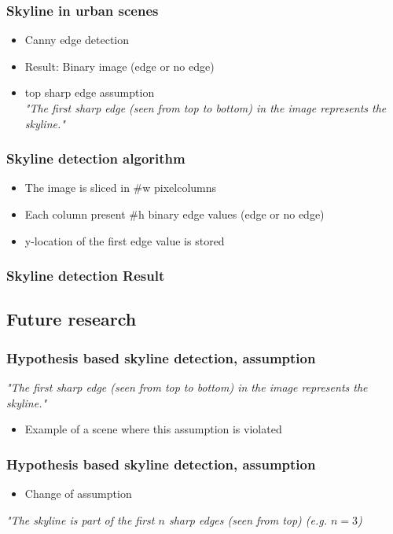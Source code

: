 \documentclass{beamer}
\begin{document}
\frame
{
	\frametitle{Skyline in urban scenes}%
	\begin{itemize}
		\item  <+-| alert@+> Canny edge detection 
		\item  <+-| alert@+> Result: Binary image (edge or no edge)
		\item  <+-| alert@+> top sharp edge assumption\\
		\emph{"The first sharp edge (seen from top to bottom) in the image represents the skyline."}
	\end{itemize}
}


\frame
{
	\frametitle{Skyline detection algorithm}%
	\begin{itemize}
		\item  <+-| alert@+> The image is sliced in \#w pixelcolumns
		\item  <+-| alert@+> Each column present \#h binary edge values (edge or no edge)
		\item  <+-| alert@+> y-location of the first edge value is stored 
	\end{itemize}
}



\frame
{
	\frametitle{Skyline detection Result}%
}

\subsection{Future research}
\frame
{
	\frametitle{Hypothesis based skyline detection, assumption}
	\emph{"The first sharp edge (seen from top to bottom) in the image represents the skyline."}
	\begin{itemize}
	\item  <+-| alert@+> Example of a scene where this assumption is violated
	\end{itemize}
}

\frame
{
	\frametitle{Hypothesis based skyline detection, assumption}
	\begin{itemize}
	\item  <+-| alert@+> Change of assumption
	\end{itemize}
	\emph{"The skyline is part of the first $n$ sharp edges (seen from top) (e.g.
	$n=3$)}
}
\end{document}
